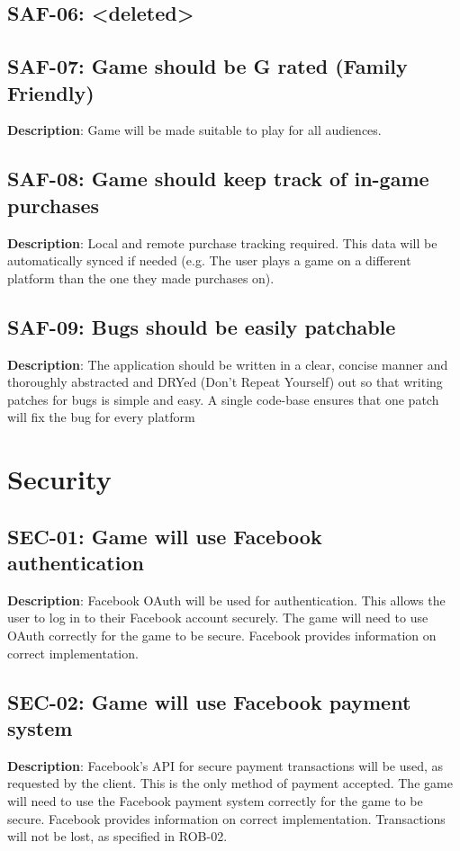 \subsection{SAF-06: <deleted>}
\subsection{SAF-07: Game should be G rated (Family Friendly)}
\textbf{Description}: Game will be made suitable to play for all audiences.
\subsection{SAF-08: Game should keep track of in-game purchases}
\textbf{Description}: Local and remote purchase tracking required. This data
will be automatically synced if needed (e.g. The user plays a game
on a different platform than the one they made purchases on). 
\subsection{SAF-09: Bugs should be easily patchable}
\textbf{Description}: The application should be written in a clear, concise
manner and thoroughly abstracted and DRYed (Don\textquoteright{}t
Repeat Yourself) out so that writing patches for bugs is simple and
easy. A single code-base ensures that one patch will fix the bug for
every platform
\section{Security}
\subsection{SEC-01: Game will use Facebook authentication}
\textbf{Description}: Facebook OAuth will be used for authentication. This
allows the user to log in to their Facebook account securely. The
game will need to use OAuth correctly for the game to be secure. Facebook
provides information on correct implementation.
\subsection{SEC-02: Game will use Facebook payment system}
\textbf{Description}: Facebook\textquoteright{}s API for secure payment transactions
will be used, as requested by the client. This is the only method
of payment accepted. The game will need to use the Facebook payment
system correctly for the game to be secure. Facebook provides information
on correct implementation. Transactions will not be lost, as specified
in ROB-02.
